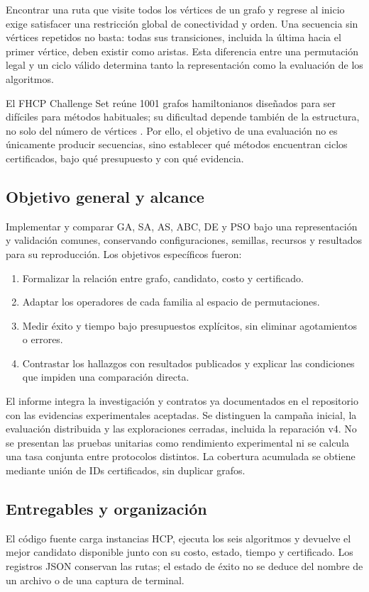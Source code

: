 Encontrar una ruta que visite todos los vértices de un grafo y regrese al inicio exige satisfacer una restricción global de conectividad y orden. Una secuencia sin vértices repetidos no basta: todas sus transiciones, incluida la última hacia el primer vértice, deben existir como aristas. Esta diferencia entre una permutación legal y un ciclo válido determina tanto la representación como la evaluación de los algoritmos.

El FHCP Challenge Set reúne 1001 grafos hamiltonianos diseñados para ser difíciles para métodos habituales; su dificultad depende también de la estructura, no solo del número de vértices \citep{haythorpe2018Fhcp}. Por ello, el objetivo de una evaluación no es únicamente producir secuencias, sino establecer qué métodos encuentran ciclos certificados, bajo qué presupuesto y con qué evidencia.

\subsection{Objetivo general y alcance}
Implementar y comparar GA, SA, AS, ABC, DE y PSO bajo una representación y validación comunes, conservando configuraciones, semillas, recursos y resultados para su reproducción. Los objetivos específicos fueron:
\begin{enumerate}
\item Formalizar la relación entre grafo, candidato, costo y certificado.
\item Adaptar los operadores de cada familia al espacio de permutaciones.
\item Medir éxito y tiempo bajo presupuestos explícitos, sin eliminar agotamientos o errores.
\item Contrastar los hallazgos con resultados publicados y explicar las condiciones que impiden una comparación directa.
\end{enumerate}

El informe integra la investigación y contratos ya documentados en el repositorio con las evidencias experimentales aceptadas. Se distinguen la campaña inicial, la evaluación distribuida y las exploraciones cerradas, incluida la reparación v4. No se presentan las pruebas unitarias como rendimiento experimental ni se calcula una tasa conjunta entre protocolos distintos. La cobertura acumulada se obtiene mediante unión de IDs certificados, sin duplicar grafos.

\subsection{Entregables y organización}
El código fuente carga instancias HCP, ejecuta los seis algoritmos y devuelve el mejor candidato disponible junto con su costo, estado, tiempo y certificado. Los registros JSON conservan las rutas; el estado de éxito no se deduce del nombre de un archivo o de una captura de terminal.

